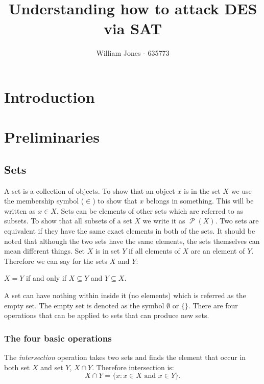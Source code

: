 \documentclass[11pt,a4paper]{report}
\author{William Jones - 635773}
\DeclareMathOperator{\power}{\mathcal{P}}
\begin{document}
\title{Understanding how to attack DES via SAT}
\maketitle
\tableofcontents

\chapter{Introduction}
\label{cha:Introduction}


\chapter{Preliminaries}
\label{cha:prelim}


\section{Sets}
\label{sec:sets}

A set is a collection of objects. To show that an object $x$ is in the set $X$ we use the membership symbol ($\in$) to show that $x$ belongs in something. This will be written as $x \in X$. Sets can be elements of other sets which are referred to as subsets. To show that all subsets of a set $X$ we write it as $\power(X)$. Two sets are equivalent if they have the same exact elements in both of the sets. It should be noted that although the two sets have the same elements, the sets themselves can mean different things. Set $X$ is in set $Y$ if all elements of $X$ are an element of $Y$.
Therefore we can say for the sets $X$ and $Y$:
\begin{center}
  $X=Y$ if and only if $X \subseteq Y$ and $Y \subseteq X$.
\end{center}
A set can have nothing within inside it (no elements) which is referred as the empty set. The empty set is denoted as the symbol $\emptyset$ or $\{\}$. There are four operations that can be applied to sets that can produce new sets.  

\subsection{The four basic operations}
\label{sec:fourbasop}

The \emph{intersection} operation takes two sets and finds the element that occur in both set $X$ and set $Y$, $X \cap Y$. Therefore intersection is:
\begin{displaymath}
  X \cap Y = \{x : x \in X  \text{ and } x \in Y\}.
\end{displaymath}
\end{document}
